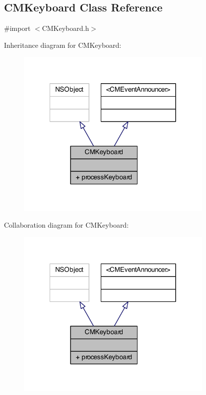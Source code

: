 \subsection{C\-M\-Keyboard Class Reference}
\label{interface_c_m_keyboard}


{\ttfamily \#import $<$C\-M\-Keyboard.\-h$>$}



Inheritance diagram for C\-M\-Keyboard\-:
\nopagebreak
\begin{figure}[H]
\begin{center}
\leavevmode
\includegraphics[width=269pt]{interface_c_m_keyboard__inherit__graph}
\end{center}
\end{figure}


Collaboration diagram for C\-M\-Keyboard\-:
\nopagebreak
\begin{figure}[H]
\begin{center}
\leavevmode
\includegraphics[width=269pt]{interface_c_m_keyboard__coll__graph}
\end{center}
\end{figure}
